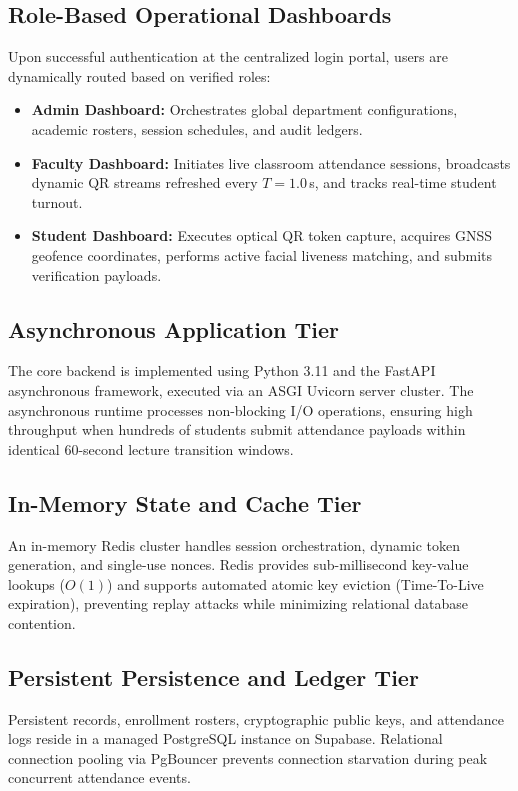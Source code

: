 \documentclass[conference]{IEEEtran}
\begin{document}
\subsection{Role-Based Operational Dashboards}
Upon successful authentication at the centralized login portal, users are dynamically routed based on verified roles:
\begin{itemize}
    \item \textbf{Admin Dashboard:} Orchestrates global department configurations, academic rosters, session schedules, and audit ledgers.
    \item \textbf{Faculty Dashboard:} Initiates live classroom attendance sessions, broadcasts dynamic QR streams refreshed every $T = 1.0$\,s, and tracks real-time student turnout.
    \item \textbf{Student Dashboard:} Executes optical QR token capture, acquires GNSS geofence coordinates, performs active facial liveness matching, and submits verification payloads.
\end{itemize}

\subsection{Asynchronous Application Tier}
The core backend is implemented using Python 3.11 and the FastAPI asynchronous framework, executed via an ASGI Uvicorn server cluster. The asynchronous runtime processes non-blocking I/O operations, ensuring high throughput when hundreds of students submit attendance payloads within identical 60-second lecture transition windows.

\subsection{In-Memory State and Cache Tier}
An in-memory Redis cluster handles session orchestration, dynamic token generation, and single-use nonces. Redis provides sub-millisecond key-value lookups ($O(1)$) and supports automated atomic key eviction (Time-To-Live expiration), preventing replay attacks while minimizing relational database contention.

\subsection{Persistent Persistence and Ledger Tier}
Persistent records, enrollment rosters, cryptographic public keys, and attendance logs reside in a managed PostgreSQL instance on Supabase. Relational connection pooling via PgBouncer prevents connection starvation during peak concurrent attendance events.
\end{document}
